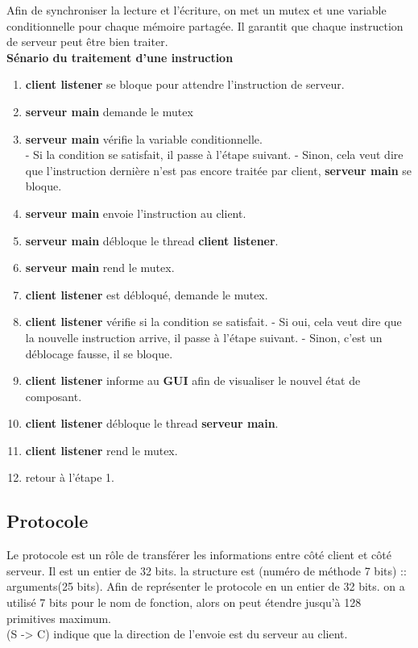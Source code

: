 \documentclass[14px]{article}
\begin{document}
Afin de synchroniser la lecture et l'écriture, on met un mutex et une variable conditionnelle pour chaque mémoire partagée. Il garantit que chaque instruction de serveur peut être bien traiter.\\

\textbf{Sénario du traitement d'une instruction}
\begin{enumerate}
    \item \textbf{client listener} se bloque pour attendre l'instruction de serveur.
    \item \textbf{serveur main} demande le mutex
    \item \textbf{serveur main} vérifie la variable conditionnelle.\\
    - Si la condition se satisfait, il passe à l'étape suivant.
    - Sinon, cela veut dire que l'instruction dernière n'est pas encore traitée par client, \textbf{serveur main} se bloque.
    \item \textbf{serveur main} envoie l'instruction au client.
    \item \textbf{serveur main} débloque le thread \textbf{client listener}.
    \item \textbf{serveur main} rend le mutex.
    \item \textbf{client listener} est débloqué, demande le mutex.
    \item \textbf{client listener} vérifie si la condition se satisfait.
    - Si oui, cela veut dire que la nouvelle instruction arrive, il passe à l'étape suivant.
    - Sinon, c'est un déblocage fausse, il se bloque.
    \item \textbf{client listener} informe au \textbf{GUI} afin de visualiser le nouvel état de composant.
    \item \textbf{client listener} débloque le thread \textbf{serveur main}.
    \item \textbf{client listener} rend le mutex.
    \item retour à l'étape 1.
\end{enumerate}

\clearpage

\subsection{Protocole}
Le protocole est un rôle de transférer les informations entre côté client et côté serveur. Il est un entier de 32 bits. la structure est (numéro de méthode 7 bits) :: arguments(25 bits).
Afin de représenter le protocole en un entier de 32 bits. on a utilisé 7 bits pour le nom de fonction, alors on peut étendre jusqu'à 128 primitives maximum. \\
(S -> C) indique que la direction de l'envoie est du serveur au client.
\end{document}
